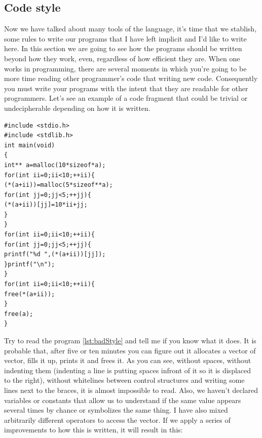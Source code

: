 \documentclass[a4paper]{article}
\begin{document}
\subsection{Code style}
Now we have talked about many tools of the language, it's time that we stablish,
some rules to write our programs that I have left implicit and I'd like to write
here. In this section we are going to see how the programs should be written
beyond how they work, even, regardless of how efficient they are. When one works
in programming, there are several moments in which you're going to be more time
reading other programmer's code that writing new code. Consequently you must
write your programs with the intent that they are readable for other
programmers. Let's see an example of a code fragment that could be trivial or
undecipherable depending on how it is written.

\noindent
\begin{minipage}[H]{\linewidth}
\mbox{}
\begin{lstlisting}[style=C,
caption={Example of a program with a bad style},
label={lst:badStyle}]
#include <stdio.h>
#include <stdlib.h>
int main(void)
{
int** a=malloc(10*sizeof*a);
for(int ii=0;ii<10;++ii){
(*(a+ii))=malloc(5*sizeof**a);
for(int jj=0;jj<5;++jj){
(*(a+ii))[jj]=10*ii+jj;
}
}
for(int ii=0;ii<10;++ii){
for(int jj=0;jj<5;++jj){
printf("%d ",(*(a+ii))[jj]);
}printf("\n");
}
for(int ii=0;ii<10;++ii){
free(*(a+ii));
}
free(a);
}
\end{lstlisting}
\end{minipage}

Try to read the program \ref{lst:badStyle} and tell me if you know what it does.
It is probable that, after five or ten minutes you can figure out it allocates
a vector of vector, fills it up, prints it and frees it. As you can see, without
spaces, without indenting them (indenting a line is putting spaces infront of it
so it is displaced to the right), without whitelines between control
structures and writing some lines next to the braces, it is almost impossible
to read. Also, we haven't declared variables or constants that allow us to
understand if the same value appears several times
by chance or symbolizes the same thing.
I have also mixed arbitrarily different operators to access the vector. If
we apply a series of improvements to how this is written, it will result in
this:
\end{document}
